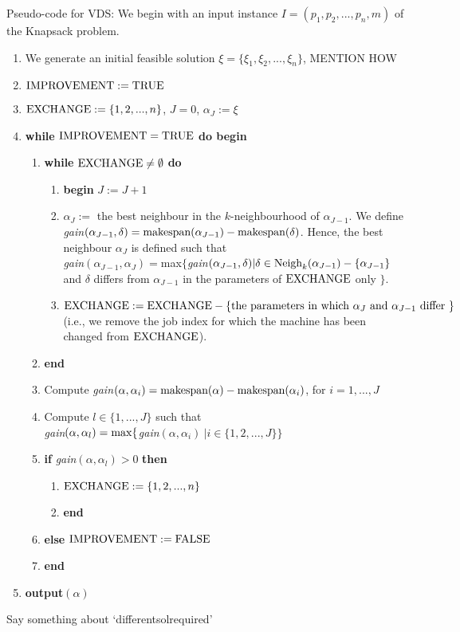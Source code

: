 \documentclass[12pt,a4paper,leqno]{article}
\begin{document}
Pseudo-code for VDS:
We begin with an input instance $I = (p_1,p_2,...,p_n,m)$ of the Knapsack problem. 
\begin{enumerate}
\item We generate an initial feasible solution $\xi = \{\xi_1,\xi_2,...,\xi_n\}$, \color{red} MENTION HOW \color{black}
\item $\textnormal{IMPROVEMENT} := \textnormal{TRUE}$
\item $\textnormal{EXCHANGE} := \{1,2,...,n\}$, $J=0$, $\alpha_J := \xi$
\item \textbf{while} $\textnormal{IMPROVEMENT} = \textnormal{TRUE}$ \textbf{do begin}
\begin{enumerate}
\item \textbf{while} $\textnormal{EXCHANGE} \neq \emptyset$ \textbf{do}
\begin{enumerate}
\item \textbf{begin} $J := J+1$
\item $\alpha_J := $ the best neighbour in the $k$-neighbourhood of $\alpha_{J-1}$. We define \textit{gain}$(\alpha_{J-1}, \delta) = \textnormal{makespan}(\alpha_{J-1}) - \textnormal{makespan}(\delta)$. Hence, the best neighbour $\alpha_J$ is defined such that \\ \textit{gain}$(\alpha_{J-1},\alpha_J) = $max$\{$\textit{gain}$(\alpha_{J-1},\delta) | \delta \in \textnormal{Neigh}_k(\alpha_{J-1}) - \{\alpha_{J-1} \}$ and $\delta$ differs from $\alpha_{J-1}$ in the parameters of $\textnormal{EXCHANGE}$ only $\}$.
\item $\textnormal{EXCHANGE} := \textnormal{EXCHANGE} - \{ \textnormal{the parameters in which } \alpha_J \textnormal{ and } \alpha_{J-1} \textnormal{ differ } \}$ (i.e., we remove the job index for which the machine has been changed from $\textnormal{EXCHANGE}$). 
\end{enumerate}
\item \textbf{end}
\item Compute \textit{gain}$(\alpha,\alpha_i) = \textnormal{makespan}(\alpha) - \textnormal{makespan}(\alpha_i)$, for $i=1,...,J$
\item Compute $l \in \{1,...,J\}$ such that \\ \textit{gain}$(\alpha,\alpha_l) = \textnormal{max}\{$\textit{gain}$(\alpha,\alpha_i) \> | i \in \{1,2,...,J\} \}$
\item \textbf{if} \textit{gain}$(\alpha,\alpha_l) > 0$ \textbf{then}
\begin{enumerate}
\item $\textnormal{EXCHANGE} := \{1,2,...,n\}$
\item \textbf{end}
\end{enumerate}
\item \textbf{else} $\textnormal{IMPROVEMENT} := \textnormal{FALSE}$
\item \textbf{end}
\end{enumerate}
\item \textbf{output}$(\alpha)$
\end{enumerate}




Say something about `differentsolrequired'
\end{document}
